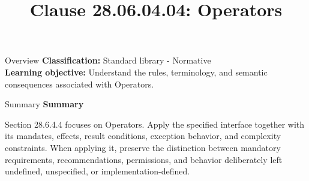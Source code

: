 \documentclass[10pt,letterpaper]{article}
\title{Clause 28.06.04.04: Operators}
\author{}
\date{}
\begin{document}
\maketitle
\begin{CornellOverviewBox}{Overview}
\textbf{Classification:} Standard library - Normative\\[2pt]
\textbf{Learning objective:} Understand the rules, terminology, and semantic consequences associated with Operators.
\end{CornellOverviewBox}\begin{CornellSummaryBox}{Summary}
{\sffamily\bfseries\color{Accent} Summary}\par\vspace{3pt}Section 28.6.4.4 focuses on Operators. Apply the specified interface together with its mandates, effects, result conditions, exception behavior, and complexity constraints. When applying it, preserve the distinction between mandatory requirements, recommendations, permissions, and behavior deliberately left undefined, unspecified, or implementation-defined.
\end{CornellSummaryBox}
\end{document}
